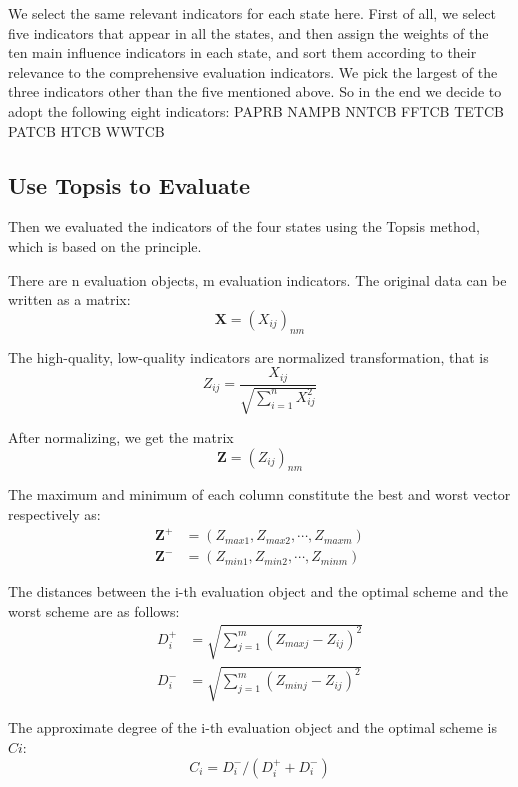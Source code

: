 \documentclass{mcmthesis}
\begin{document}
We select the same relevant indicators for each state here.
First of all, we select five indicators that appear in all the states, and then assign the weights of the ten main influence indicators in each state, and sort them according to their relevance to the comprehensive evaluation indicators. We pick the largest of the three indicators other than the five mentioned above. So in the end we decide to adopt the following eight indicators:
PAPRB  NAMPB  NNTCB  FFTCB  TETCB  PATCB  HTCB  WWTCB
\subsection{Use Topsis to Evaluate}
Then we evaluated the indicators of the four states using the Topsis method, which is based on the principle\cite{wikitopsis}.

There are n evaluation objects, m evaluation indicators. The original data can be written as a matrix:
\begin{equation}
  \mathbf{X} = (X_{ij})_{nm} 
\end{equation}

The high-quality, low-quality indicators are normalized transformation, that is
\begin{equation}
  Z_{ij} = \frac{X_{ij}}{\sqrt{\sum\limits_{i=1}^{n}X_{ij}^2}}
\end{equation}

After normalizing, we get the matrix
\begin{equation}
  \mathbf{Z} = (Z_{ij})_{nm}
\end{equation}

The maximum and minimum of each column constitute the best and worst vector respectively as:
\begin{align}
  \mathbf{Z^+} &= (Z_{max1}, Z_{max2}, \cdots, Z_{maxm})   \\
  \mathbf{Z^-} &= (Z_{min1}, Z_{min2}, \cdots, Z_{minm})
\end{align}

The distances between the i-th evaluation object and the optimal scheme and the worst scheme are as follows:
\begin{align}
   D_i^+ &= \sqrt{ \sum\limits_{j=1}^m (Z_{maxj} - Z_{ij})^2 } \\
   D_i^- &= \sqrt{ \sum\limits_{j=1}^m (Z_{minj} - Z_{ij})^2 }
\end{align}

The approximate degree of the i-th evaluation object and the optimal scheme is $Ci$:
\begin{equation}
  C_i = D_i^- / (D_i^+ + D_i^-)
\end{equation}
\end{document}
